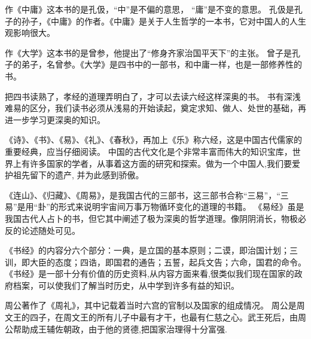 \documentclass[avery5371,grid]{flashcards}
\begin{document}
{作《中庸》这本书的是孔伋，“中”是不偏的意思， “庸”是不变的意思。} %
{孔伋是孔子的孙子，《中庸》的作者。《中庸》是关于人生哲学的一本书，它对中国人的人生观影响很大。} %

{作《大学》这本书的是曾参，他提出了“修身齐家治国平天下”的主张。} %
{曾子是孔子的弟子，名曾参。《大学》是四书中的一部书，和中庸一样，也是一部修养性的书。} %


{把四书读熟了，孝经的道理弄明白了，才可以去读六经这样深奥的书。} %
{书有深浅难易的区分，我们读书必须从浅易的开始读起，奠定求知、做人、处世的基础，再进一步学习更深奥的知识。} %


{《诗》、《书》、《易》、《礼》、《春秋》，再加上《乐》称六经，这是中国古代儒家的重要经典，应当仔细阅读。} %
{中国的古代文化是个非常丰富而伟大的知识宝库，世界上有许多国家的学者，从事着这方面的研究和探索。做为一个中国人,我们要爱护祖先留下的遗产, 并为此感到骄傲。} %

{《连山》、《归藏》、《周易》，是我国古代的三部书，这三部书合称“三易”，“三易”是用“卦”的形式来说明宇宙间万事万物循环变化的道理的书籍。} %
{《易经》虽是我国古代人占卜的书，但它其中阐述了极为深奥的哲学道理。像阴阴消长，物极必反的论述随处可见。} %

{《书经》的内容分六个部分：一典，是立国的基本原则；二谟，即治国计划；三训，即大臣的态度；四诰，即国君的通告；五誓，起兵文告；六命，国君的命令。} %
{《书经》是一部十分有价值的历史资料,从内容方面来看,很类似我们现在国家的政府档案，可以使我们了解当时历史，从中学到许多有益的知识。} %

{周公著作了《周礼》，其中记载着当时六宫的官制以及国家的组成情况。} %
{周公是周文王的四子，在周文王的所有儿子中最有才干，也最有仁慈之心。武王死后，由周公帮助成王辅佐朝政，由于他的贤德,把国家治理得十分富强.} %
\end{document}
